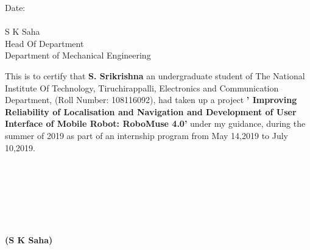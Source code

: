 \documentclass[12pt]{article}
\begin{document}
\newpage

\begin{minipage}{0.6\textwidth}
\begin{large}
\vspace{7cm}
Date:\\\\
S K Saha\\
Head Of Department\\
Department of Mechanical Engineering\\
\end{large}
\end{minipage}

\vspace{1.5cm}
\begin{large}
{
This is to certify that \textbf{S. Srikrishna} an undergraduate student of The National Institute Of Technology, Tiruchirappalli, Electronics and Communication Department, (Roll Number: 108116092), had taken up a project \textbf{' Improving Reliability of Localisation and Navigation and Development of User Interface of Mobile Robot: RoboMuse 4.0'} under my guidance, during the summer of 2019 as part of an internship program from May 14,2019 to July 10,2019. 
\\\\\\\\  \\\\\\ 
} 
\end{large}
\vspace{0.7in}
\qquad\qquad\qquad\qquad\qquad\qquad\qquad\qquad\qquad\qquad\qquad\qquad\qquad\qquad\qquad\qquad \textbf{(S K Saha)} 

\cleardoublepage
\end{document}
